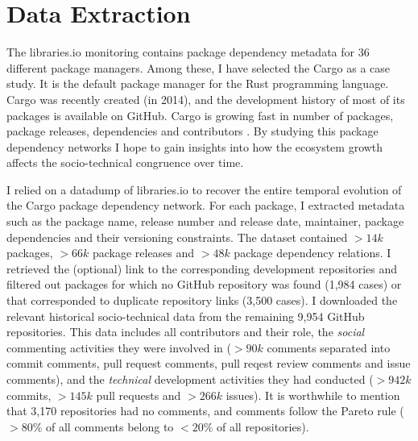 \section{Data Extraction}

The \textsf{libraries.io} monitoring contains package dependency metadata for 36 different package managers.
Among these, I have selected the Cargo as a case study. It is the default package manager for %
the Rust programming language. Cargo was recently created (in 2014), and the development history of most of its packages is available on GitHub. 
Cargo is growing fast in number of packages, package releases, dependencies and contributors \cite{Decan2019EMSE}. 
By studying this package dependency networks I hope to gain insights into how the ecosystem growth affects the socio-technical congruence over time.

I relied on a datadump of libraries.io \cite{Katz2018} to recover the entire temporal evolution of the Cargo package dependency network. 
For each package, I extracted metadata such as the package name, release number and release date, maintainer, package dependencies and their versioning constraints. 
The dataset contained $>14k$ packages, $>66k$ package releases and $>48k$ package dependency relations.
I retrieved the (optional) link to the corresponding development repositories and filtered out packages for which no GitHub repository was found (1,984 cases) %
or that corresponded to duplicate repository links (3,500 cases).
I downloaded the relevant historical socio-technical data from the remaining 9,954 GitHub repositories.
This data includes all contributors and their role, the \emph{social} commenting activities they were involved in ($>90k$ comments separated into commit comments, pull request comments, pull reqest review comments and issue comments), and the \emph{technical} development activities they had conducted ($>942k$ commits, $>145k$ pull requests and $>266k$ issues).
It is worthwhile to mention that 3,170 repositories had no comments, and comments follow the Pareto rule ($>80\%$ of all comments belong to $<20\%$ of all repositories).